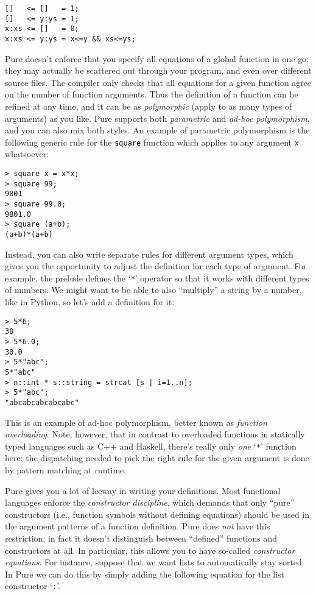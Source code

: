 \documentclass[a4paper,12pt]{article}
\begin{document}
\begin{lstlisting}
[]   <= []   = 1;
[]   <= y:ys = 1;
x:xs <= []   = 0;
x:xs <= y:ys = x<=y && xs<=ys;
\end{lstlisting}

Pure doesn't enforce that you specify all equations of a global function in one go; they may actually be scattered out through your program, and even over different source files. The compiler only checks that all equations for a given function agree on the number of function arguments. Thus the definition of a function can be refined at any time, and it can be as \emph{polymorphic} (apply to as many types of arguments) as you like. Pure supports both \emph{parametric} and \emph{ad-hoc polymorphism}, and you can also mix both styles. An example of parametric polymorphism is the following generic rule for the \verb|square| function which applies to any argument \verb|x| whatsoever:

\begin{lstlisting}
> square x = x*x;
> square 99;
9801
> square 99.0;
9801.0
> square (a+b);
(a+b)*(a+b)
\end{lstlisting}

Instead, you can also write separate rules for different argument types, which gives you the opportunity to adjust the definition for each type of argument. For example, the prelude defines the `\verb|*|' operator so that it works with different types of numbers. We might want to be able to also ``multiply'' a string by a number, like in Python, so let's add a definition for it:

\begin{lstlisting}
> 5*6;
30
> 5*6.0;
30.0
> 5*"abc";
5*"abc"
> n::int * s::string = strcat [s | i=1..n];
> 5*"abc";
"abcabcabcabcabc"
\end{lstlisting}

This is an example of ad-hoc polymorphism, better known as \emph{function overloading}. Note, however, that in contrast to overloaded functions in statically typed languages such as C++ and Haskell, there's really only \emph{one} `\verb|*|' function here; the dispatching needed to pick the right rule for the given argument is done by pattern matching at runtime.

Pure gives you a lot of leeway in writing your definitions. Most functional languages enforce the \emph{constructor discipline}, which demands that only ``pure'' constructors (i.e., function symbols without defining equations) should be used in the argument patterns of a function definition. Pure does \emph{not} have this restriction; in fact it doesn't distinguish between ``defined'' functions and constructors at all. In particular, this allows you to have so-called \emph{constructor equations}. For instance, suppose that we want lists to automatically stay sorted. In Pure we can do this by simply adding the following equation for the list constructor `\verb|:|'.
\end{document}

